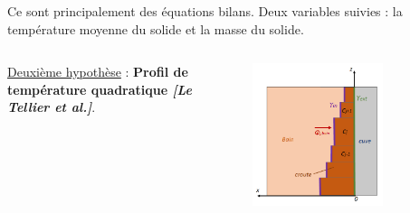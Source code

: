 \documentclass{beamer}
\newcommand{\bib}[1]{{\color{cea_texte!80}\tiny\textit{[#1]}}}
\begin{document}
\begin{frame}
\color{cea_texte!70}	Ce sont principalement des équations bilans. Deux variables suivies : la température moyenne du solide et la masse du solide.\color{cea_texte}
\begin{columns}[c]
	\begin{column}{0.55\textwidth}
	\underline{Deuxième hypothèse} : \textbf{Profil de température quadratique \bib{Le Tellier et al.}}.%
	\vspace{0.5cm}
	\fbox{\begin{minipage}[]{\textwidth}
	\center\textcolor{red}{On cherche à lever ces deux hypothèses.}
	\end{minipage}}
	\end{column}
    \begin{column}{0.45\textwidth}
	\begin{center} 
	\includegraphics[width=0.62\textwidth]{Figures/modele_croute_0D.png}
			
		\end{center}
		\end{column}
\end{columns}
\end{frame}
\end{document}
